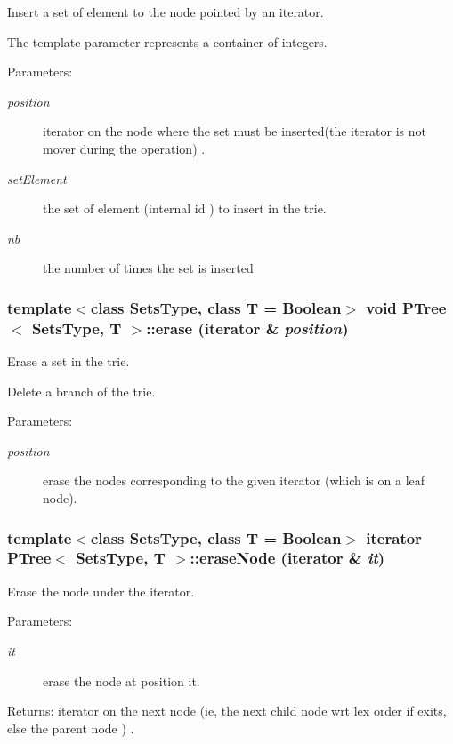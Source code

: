 Insert a set of element to the node pointed by an iterator. 

The template parameter represents a container of integers. \begin{Desc}
\item[Parameters:]
\begin{description}
\item[{\em position}]iterator on the node where the set must be inserted(the iterator is not mover during the operation) . \item[{\em set\-Element}]the set of element (internal id ) to insert in the trie. \item[{\em nb}]the number of times the set is inserted \end{description}
\end{Desc}
\subsubsection{\setlength{\rightskip}{0pt plus 5cm}template$<$class Sets\-Type, class T = Boolean$>$ void {\bf PTree}$<$ Sets\-Type, T $>$::erase ({\bf iterator} \& {\em position})\hspace{0.3cm}{\tt  [inline]}}\label{class_p_tree_2e9e4620ff40789547e6a5fdbe5eb8e9}


Erase a set in the trie. 

Delete a branch of the trie. \begin{Desc}
\item[Parameters:]
\begin{description}
\item[{\em position}]erase the nodes corresponding to the given iterator (which is on a leaf node). \end{description}
\end{Desc}
\subsubsection{\setlength{\rightskip}{0pt plus 5cm}template$<$class Sets\-Type, class T = Boolean$>$ {\bf iterator} {\bf PTree}$<$ Sets\-Type, T $>$::erase\-Node ({\bf iterator} \& {\em it})\hspace{0.3cm}{\tt  [inline]}}\label{class_p_tree_8d8b9a315dc17b7b13a18dcb81d99f0f}


Erase the node under the iterator. 

\begin{Desc}
\item[Parameters:]
\begin{description}
\item[{\em it}]erase the node at position it. \end{description}
\end{Desc}
\begin{Desc}
\item[Returns:]iterator on the next node (ie, the next child node wrt lex order if exits, else the parent node ) . \end{Desc}
